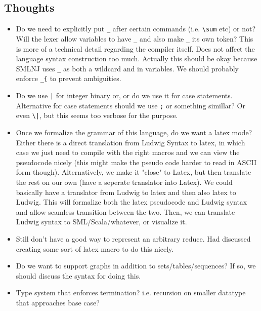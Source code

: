 \clearpage

\subsection{Thoughts}

\begin{itemize}
\item Do we need to explicitly put \verb|_| after certain commands (i.e. \verb|\sum| etc) or not? Will the lexer allow variables to have \verb|_| and also make \verb|_| its own token? This is more of a technical detail regarding the compiler itself. Does not affect the language syntax construction too much. Actually this should be okay because SMLNJ uses \verb"_" as both a wildcard and in variables. We should probably enforce \verb"_{" to prevent ambiguities. 

\item Do we use \verb"|" for integer binary or, or do we use it for case statements. Alternative for case statements should we use \verb|;| or something simillar? Or even \verb"\|", but this seems too verbose for the purpose.

\item Once we formalize the grammar of this language, do we want a latex mode? Either there is a direct translation from Ludwig Syntax to latex, in which case we just need to compile with the right macros and we can view the pseudocode nicely (this might make the pseudo code harder to read in ASCII form though). Alternatively, we make it "close" to Latex, but then translate the rest on our own (have a seperate translator into Latex). We could basically have a translator from Ludwig to latex and then also latex to Ludwig. This will formalize both the latex pseudocode and Ludwig syntax and allow seamless transition between the two. Then, we can translate Ludwig syntax to SML/Scala/whatever, or visualize it.

\item Still don't have a good way to represent an arbitrary reduce. Had discussed creating some sort of latex macro to do this nicely.

\item Do we want to support graphs in addition to sets/tables/sequences? If so, we should discuss the syntax for doing this.

\item Type system that enforces termination? i.e. recursion on smaller datatype that approaches base case?
\end{itemize}
